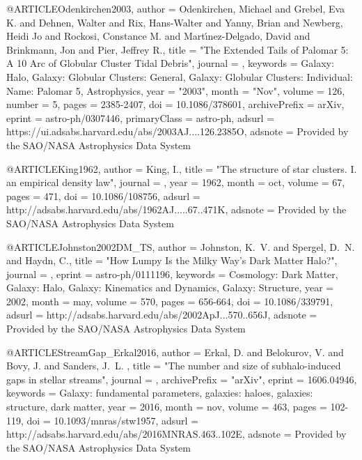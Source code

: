 \documentclass[apj]{emulateapj}
\begin{document}
{{{{{{{{{{{@ARTICLE{Odenkirchen2003,
       author = {{Odenkirchen}, Michael and {Grebel}, Eva K. and {Dehnen}, Walter and
         {Rix}, Hans-Walter and {Yanny}, Brian and {Newberg}, Heidi Jo and
         {Rockosi}, Constance M. and {Mart{\'\i}nez-Delgado}, David and
         {Brinkmann}, Jon and {Pier}, Jeffrey R.},
        title = "{The Extended Tails of Palomar 5: A 10{\textdegree} Arc of Globular Cluster Tidal Debris}",
      journal = {\aj},
     keywords = {Galaxy: Halo, Galaxy: Globular Clusters: General, Galaxy: Globular Clusters: Individual: Name: Palomar 5, Astrophysics},
         year = "2003",
        month = "Nov",
       volume = {126},
       number = {5},
        pages = {2385-2407},
          doi = {10.1086/378601},
archivePrefix = {arXiv},
       eprint = {astro-ph/0307446},
 primaryClass = {astro-ph},
       adsurl = {https://ui.adsabs.harvard.edu/abs/2003AJ....126.2385O},
      adsnote = {Provided by the SAO/NASA Astrophysics Data System}
}





@ARTICLE{King1962,
   author = {{King}, I.},
    title = "{The structure of star clusters. I. an empirical density law}",
  journal = {\aj},
     year = 1962,
    month = oct,
   volume = 67,
    pages = {471},
      doi = {10.1086/108756},
   adsurl = {http://adsabs.harvard.edu/abs/1962AJ.....67..471K},
  adsnote = {Provided by the SAO/NASA Astrophysics Data System}
}





@ARTICLE{Johnston2002DM_TS,
   author = {{Johnston}, K.~V. and {Spergel}, D.~N. and {Haydn}, C.},
    title = "{How Lumpy Is the Milky Way's Dark Matter Halo?}",
  journal = {\apj},
   eprint = {astro-ph/0111196},
 keywords = {Cosmology: Dark Matter, Galaxy: Halo, Galaxy: Kinematics and Dynamics, Galaxy: Structure},
     year = 2002,
    month = may,
   volume = 570,
    pages = {656-664},
      doi = {10.1086/339791},
   adsurl = {http://adsabs.harvard.edu/abs/2002ApJ...570..656J},
  adsnote = {Provided by the SAO/NASA Astrophysics Data System}
}


@ARTICLE{StreamGap_Erkal2016,
   author = {{Erkal}, D. and {Belokurov}, V. and {Bovy}, J. and {Sanders}, J.~L.
	},
    title = "{The number and size of subhalo-induced gaps in stellar streams}",
  journal = {\mnras},
archivePrefix = "arXiv",
   eprint = {1606.04946},
 keywords = {Galaxy: fundamental parameters, galaxies: haloes, galaxies: structure, dark matter},
     year = 2016,
    month = nov,
   volume = 463,
    pages = {102-119},
      doi = {10.1093/mnras/stw1957},
   adsurl = {http://adsabs.harvard.edu/abs/2016MNRAS.463..102E},
  adsnote = {Provided by the SAO/NASA Astrophysics Data System}
}



}}}}}}}}}}}
\end{document}
